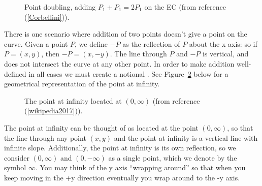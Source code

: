 \begin{figure}[H]
	  \caption{\label{fig:DH:DHKE_7}Point doubling, adding $P_1 + P_1=2P_1$ on the EC (from reference (\ref{Corbellini})).}
\end{figure}
There is one scenario where addition of two points doesn't give a point on the curve. Given a point $P$, we define  $-P$ as the reflection of $P$ about the x axis: so  if $P = (x, y)$, then $-P = (x, -y)$. The line through $P$ and $-P$ is vertical, and does not intersect the curve at any other point.  In order to make addition well-defined in all cases we must create a notional . See Figure~\ref{fig:DH:DHKE_19} below for a geometrical representation of the point at infinity.
\begin{figure}[H]
	  \caption{\label{fig:DH:DHKE_19}The point at infinity located at $(0,\infty)$ (from reference (\ref{wikipedia2017})).}
\end{figure}
The point at infinity can be thought of as located at the point $(0,\infty)$, so that the line through any point $(x, y)$ and the point at infinity is a vertical line with infinite slope. Additionally, the point at infinity is its own reflection, so we consider $(0,\infty)$ and $(0,-\infty)$ as a single point, which we denote by the symbol $\infty$. You may think of the y  axis ``wrapping around'' so that when you keep moving in the +y direction eventually you wrap around to the -y axis.
